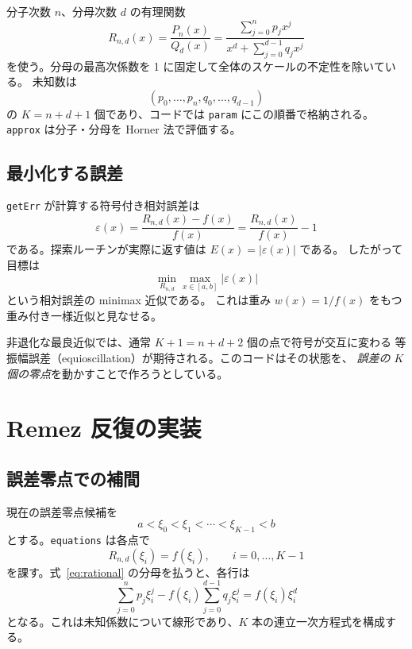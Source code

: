 \documentclass[a4paper,11pt]{ltjsarticle}
\newcommand{\code}[1]{\texttt{#1}}
\newcommand{\RelErr}{\varepsilon}
\begin{document}
分子次数 \(n\)、分母次数 \(d\) の有理関数
\begin{equation}
 R_{n,d}(x)=\frac{P_n(x)}{Q_d(x)}
 =\frac{\displaystyle\sum_{j=0}^{n}p_jx^j}
        {\displaystyle x^d+\sum_{j=0}^{d-1}q_jx^j}
 \label{eq:rational}
\end{equation}
を使う。分母の最高次係数を 1 に固定して全体のスケールの不定性を除いている。
未知数は
\begin{equation}
 (p_0,\ldots,p_n,q_0,\ldots,q_{d-1})
\end{equation}
の \(K=n+d+1\) 個であり、コードでは \code{param} にこの順番で格納される。
\code{approx} は分子・分母を Horner 法で評価する。

\subsection{最小化する誤差}

\code{getErr} が計算する符号付き相対誤差は
\begin{equation}
  \RelErr(x)=\frac{R_{n,d}(x)-f(x)}{f(x)}
             =\frac{R_{n,d}(x)}{f(x)}-1
  \label{eq:relative-error}
\end{equation}
である。探索ルーチンが実際に返す値は \(E(x)=|\RelErr(x)|\) である。
したがって目標は
\begin{equation}
  \min_{R_{n,d}}\max_{x\in[a,b]}|\RelErr(x)|
  \label{eq:minimax}
\end{equation}
という相対誤差の minimax 近似である。
これは重み \(w(x)=1/f(x)\) をもつ重み付き一様近似と見なせる。

非退化な最良近似では、通常 \(K+1=n+d+2\) 個の点で符号が交互に変わる
等振幅誤差（equioscillation）が期待される。このコードはその状態を、
\emph{誤差の \(K\) 個の零点}を動かすことで作ろうとしている。

\section{Remez 反復の実装}

\subsection{誤差零点での補間}

現在の誤差零点候補を
\begin{equation}
  a<\xi_0<\xi_1<\cdots<\xi_{K-1}<b
\end{equation}
とする。\code{equations} は各点で
\begin{equation}
  R_{n,d}(\xi_i)=f(\xi_i),\qquad i=0,\ldots,K-1
  \label{eq:interpolation}
\end{equation}
を課す。式~\eqref{eq:rational} の分母を払うと、各行は
\begin{equation}
 \sum_{j=0}^{n}p_j\xi_i^j
 - f(\xi_i)\sum_{j=0}^{d-1}q_j\xi_i^j
 = f(\xi_i)\xi_i^d
 \label{eq:linear-row}
\end{equation}
となる。これは未知係数について線形であり、\(K\) 本の連立一次方程式を構成する。
\end{document}
